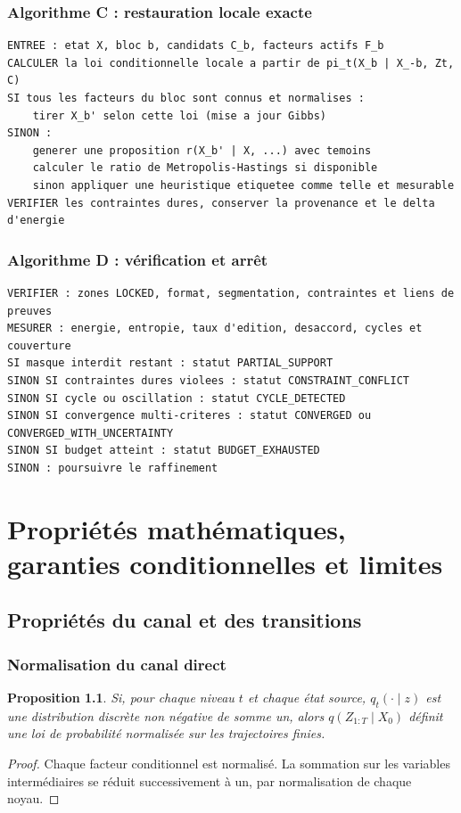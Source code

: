 \documentclass[11pt,a4paper,oneside]{report}
\newtheorem{proposition}[definition]{Proposition}
\begin{document}
\section{Algorithme C : restauration locale exacte}
\begin{lstlisting}[basicstyle=\ttfamily\small,breaklines=true,frame=single]
ENTREE : etat X, bloc b, candidats C_b, facteurs actifs F_b
CALCULER la loi conditionnelle locale a partir de pi_t(X_b | X_-b, Zt, C)
SI tous les facteurs du bloc sont connus et normalises :
    tirer X_b' selon cette loi (mise a jour Gibbs)
SINON :
    generer une proposition r(X_b' | X, ...) avec temoins
    calculer le ratio de Metropolis-Hastings si disponible
    sinon appliquer une heuristique etiquetee comme telle et mesurable
VERIFIER les contraintes dures, conserver la provenance et le delta d'energie
\end{lstlisting}

\section{Algorithme D : vérification et arrêt}
\begin{lstlisting}[basicstyle=\ttfamily\small,breaklines=true,frame=single]
VERIFIER : zones LOCKED, format, segmentation, contraintes et liens de preuves
MESURER : energie, entropie, taux d'edition, desaccord, cycles et couverture
SI masque interdit restant : statut PARTIAL_SUPPORT
SINON SI contraintes dures violees : statut CONSTRAINT_CONFLICT
SINON SI cycle ou oscillation : statut CYCLE_DETECTED
SINON SI convergence multi-criteres : statut CONVERGED ou CONVERGED_WITH_UNCERTAINTY
SINON SI budget atteint : statut BUDGET_EXHAUSTED
SINON : poursuivre le raffinement
\end{lstlisting}

\part{Propriétés mathématiques, garanties conditionnelles et limites}
\chapter{Propriétés du canal et des transitions}
\section{Normalisation du canal direct}
\begin{proposition}
Si, pour chaque niveau $t$ et chaque état source, $q_t(\cdot\mid z)$ est une distribution discrète non négative de somme un, alors $q(Z_{1:T}\mid X_0)$ définit une loi de probabilité normalisée sur les trajectoires finies.
\end{proposition}
\begin{proof}
Chaque facteur conditionnel est normalisé. La sommation sur les variables intermédiaires se réduit successivement à un, par normalisation de chaque noyau.
\end{proof}
\end{document}
